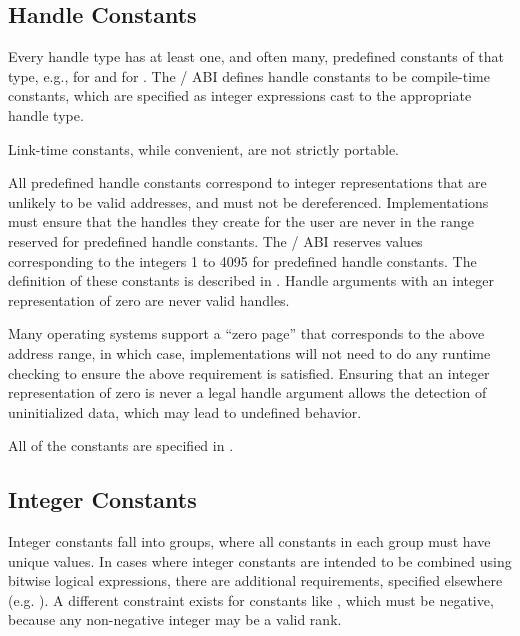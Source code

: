 \subsection{Handle Constants}

Every handle type has at least one, and often many, 
predefined constants of that type, e.g.,
 for  and 
 for .
The \MPI/ ABI defines handle constants to be compile-time constants,
which are specified as integer expressions cast to the appropriate handle type.

\begin{rationale}
Link-time constants, while convenient, are not strictly portable.
\end{rationale}

All predefined handle constants correspond to integer representations 
that are unlikely to be valid addresses, and must not be dereferenced. 
Implementations must ensure that the handles they create for the user 
are never in the range reserved for predefined handle constants. 
The \MPI/ ABI reserves values corresponding to
the integers 1 to 4095 for predefined handle constants.
The definition of these constants is described in .
Handle arguments with an integer representation of zero are never valid handles.

\begin{rationale}
Many operating systems support a ``zero page'' that corresponds 
to the above address range, in which case, implementations 
will not need to do any runtime checking to ensure the above requirement is satisfied.
Ensuring that an integer representation of zero is never a legal handle
argument allows the detection of uninitialized data, which may lead to
undefined behavior.
\end{rationale}

All of the constants are specified in .

\subsection{Integer Constants}

Integer constants fall into groups, where all constants in each group must have unique values. 
In cases where integer constants are intended to be combined using bitwise logical expressions, 
there are additional requirements, specified elsewhere
(e.g. ).
A different constraint exists for constants like , 
which must be negative, because any non-negative integer may be a valid rank.

